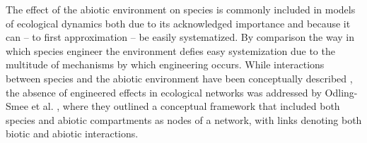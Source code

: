 \documentclass[9pt,twocolumn,twoside]{pnas-new}
\begin{document}



% 




The effect of the abiotic environment on species is commonly included in models of ecological dynamics \cite{Woodward2010,Brose2012,Gibert2019b} both due to its acknowledged importance and because it can -- to first approximation -- be easily systematized. 
By comparison the way in which species engineer the environment defies easy systemization due to the multitude of mechanisms by which engineering occurs.
While interactions between species and the abiotic environment have been conceptually described \cite{Olff2009,Getz2011}, the absence of engineered effects in ecological networks was addressed by Odling-Smee et al. \cite{OdlingSmee2013}, where they outlined a conceptual framework that included both species and abiotic compartments as nodes of a network, with links denoting both biotic and abiotic interactions.
\end{document}
